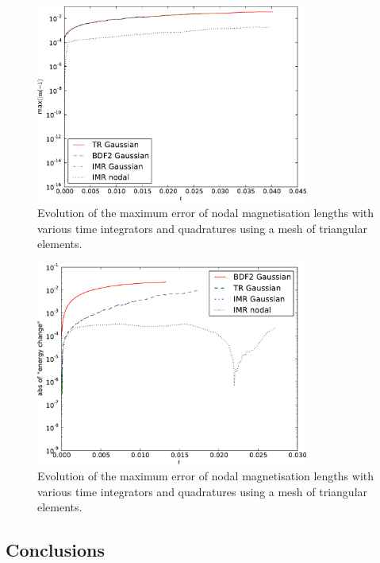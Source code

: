 \begin{figure}
  \centering
  \includegraphics[width=0.8\textwidth]{plots/2d_wave_solution_m_length_triangles/mlengtherrormaxesvstimes.pdf}
  \caption{Evolution of the maximum error of nodal magnetisation lengths with various time integrators and quadratures using a mesh of triangular elements.}
  \label{fig:ml-error-triangle-mesh}
\end{figure}

\begin{figure}
  \centering
  \includegraphics[width=0.8\textwidth]{plots/2d_wave_solution_energy_triangles/absofenergychangevstimes.pdf}
  \caption{Evolution of the maximum error of nodal magnetisation lengths with various time integrators and quadratures using a mesh of triangular elements.}
  \label{fig:energy-error-triangle-mesh}
\end{figure}


\subsection{Conclusions}

